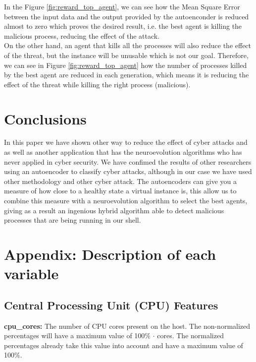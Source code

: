 \documentclass{iosart2c}
\begin{document}
In the Figure \ref{fig:reward_top_agent}, we can see how the Mean Square Error between the input data and the output provided by the autoenconder is reduced almost to zero which proves the desired result, i.e. the best agent is killing the malicious process, reducing the effect of the attack. \\

On the other hand, an agent that kills all the processes will also reduce the effect of the threat, but the instance will be unusable which is not our goal. Therefore, we can see in Figure \ref{fig:reward_top_agent} how the number of processes killed by the best agent are reduced in each generation, which means it is reducing the effect of the threat while killing the right process (malicious).\\


\section{Conclusions}

In this paper we have shown other way to reduce the effect of cyber attacks and as well as another application that has the neuroevolution algorithms who has never applied in cyber security. We have confimed the results of other researchers \cite{autoencoderdos} using an autoencoder to classify cyber attacks, although in our case we have used other methodology and other cyber attack. The autoencoders can give you a measure of how close to a healthy state a virtual instance is, this allow us to combine this measure with a neuroevolution algorithm to select the best agents, giving as a result an ingenious hybrid algorithm able to detect malicious processes that are being running in our shell. 


\appendix
\section{Appendix: Description of each variable}\label{appx_variables}

\subsection{Central Processing Unit (CPU) Features}

\textbf{cpu\_cores:} The number of CPU cores present on the host. The non-normalized percentages will have a maximum value of 100\% $\cdot$ cores. The normalized percentages already take this value into account and have a maximum value of 100\%.\\
\end{document}
